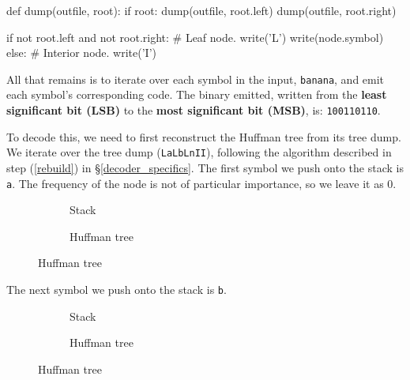 \begin{pylisting}{}
def dump(outfile, root):
    if root:
        dump(outfile, root.left)
        dump(outfile, root.right)

        if not root.left and not root.right:
            # Leaf node.
            write('L')
            write(node.symbol)
        else:
            # Interior node.
            write('I')
\end{pylisting}

All that remains is to iterate over each symbol in the input,
\texttt{banana}, and emit each symbol's corresponding code. The binary
emitted, written from the \textbf{least significant bit (LSB)} to the
\textbf{most significant bit (MSB)}, is: \texttt{100110110}.

To decode this, we need to first reconstruct the Huffman tree from its
tree dump. We iterate over the tree dump (\texttt{LaLbLnII}), following
the algorithm described in step (\ref{rebuild}) in
\S\ref{decoder_specifics}. The first symbol we push onto the stack is
\texttt{a}. The frequency of the node is not of particular importance,
so we leave it as 0.

\begin{figure}[H]
  \centering
  \begin{subfigure}[b]{0.4\linewidth}
    \centering
    \caption{Stack}
  \end{subfigure}
  \begin{subfigure}[b]{0.4\linewidth}
    \caption{Huffman tree}
  \end{subfigure}
\end{figure}

The next symbol we push onto the stack is \texttt{b}.

\begin{figure}[H]
  \centering
  \begin{subfigure}[b]{0.4\linewidth}
    \centering
    \caption{Stack}
  \end{subfigure}
  \begin{subfigure}[b]{0.4\linewidth}
    \caption{Huffman tree}
  \end{subfigure}
\end{figure}

